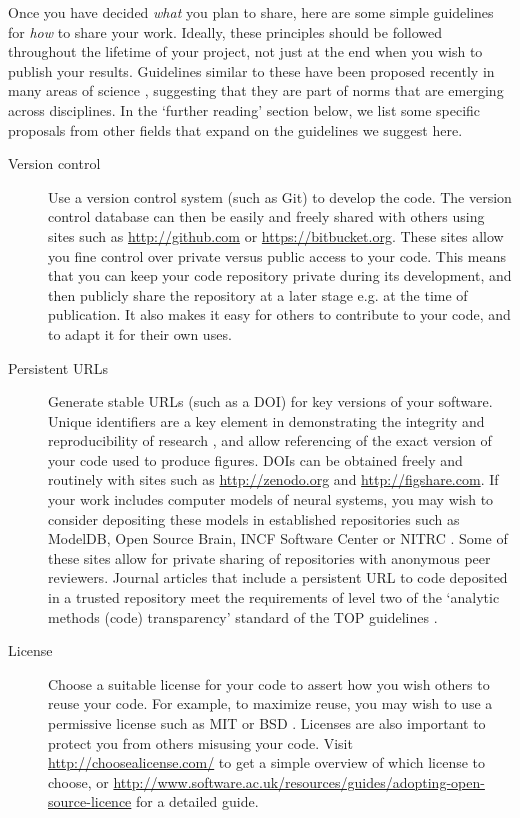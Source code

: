 \documentclass[11pt]{article}
\begin{document}
Once you have decided \textit{what} you plan to share, here are some simple 
guidelines for \textit{how} to share your work.  Ideally, these
principles should be followed throughout the lifetime of your project,
not just at the end when you wish to publish your results. Guidelines similar to these have been proposed recently in many areas of science \cite{Nosek2015, miguel2014, stodden2012journals}, suggesting that they are part of norms that are emerging across disciplines. In the `further reading' section below, we list some specific proposals from other fields that expand on the guidelines we suggest here.  

\begin{description}
\item [Version control] Use a version control system (such as Git) to
  develop the code.  The version control database can then be easily
  and freely shared with others using sites such as
  \url{http://github.com} \cite{Ram2013} or
  \url{https://bitbucket.org}.  These sites allow you fine control
  over private versus public access to your code.  This means that you
  can keep your code repository private during its development, and
  then publicly share the repository at a later stage e.g. at the time
  of publication. It also makes it easy for others to contribute to your code, and to adapt it for their own uses. 

\item [Persistent URLs] Generate stable URLs (such as a DOI) for key
  versions of your software.  Unique identifiers are a key element in
  demonstrating the integrity and reproducibility of research
  \cite{vasilevsky2013reproducibility}, and allow referencing of the 
  exact version of your code used to produce figures. DOIs can be
  obtained freely and routinely with sites such as
  \url{http://zenodo.org} and \url{http://figshare.com}.  If your work
  includes computer models of neural systems, you may wish to consider
  depositing these models in established repositories such as
  ModelDB\cite{modeldb}, Open Source Brain\cite{osb}, INCF
  Software Center\cite{web:incf-software} or NITRC
  \cite{poline_software_2014}. Some of these sites allow for private
  sharing of repositories with anonymous peer reviewers. Journal
  articles that include a persistent URL to code deposited in a
  trusted repository meet the requirements of level two of the
  `analytic methods (code) transparency' standard of the TOP
  guidelines \cite{Nosek2015}.


\item [License] Choose a suitable license for your code to assert how
  you wish others to reuse your code.  For example, to maximize reuse,
  you may wish to use a permissive license such as MIT or BSD
  \cite{stodden2009enabling}.  Licenses are also important to protect you from
  others misusing your code.  Visit \url{http://choosealicense.com/}
  to get a simple overview of which license to choose, or 
  \url{http://www.software.ac.uk/resources/guides/adopting-open-source-licence}
  for a detailed guide.


\end{description}
\end{document}
